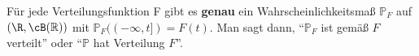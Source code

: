 \begin{satz}\label{EindVert}
	Für jede Verteilungsfunktion F gibt es \textbf{genau} ein Wahrscheinlichkeitsmaß $\mathbb{P}_F$ auf $(\R,\cB(\mathbb{R}))$ mit $\mathbb{P}_F((-\infty,t]) = F(t)$. Man sagt dann, \enquote{$\mathbb{P}_F$ ist gemäß $F$ verteilt} oder \enquote{$\mathbb{P}$ hat Verteilung $F$}.
\end{satz}

